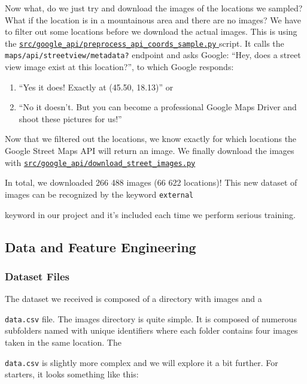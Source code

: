 \documentclass[]{article}
\providecommand{\tightlist}{%
  \setlength{\itemsep}{0pt}\setlength{\parskip}{0pt}}
\let\oldtexttt\texttt
\renewcommand{\texttt}[1]{
  \textcolor{tcolor}{\colorbox{bgcolor}{\oldtexttt{#1}}}
}
\begin{document}
Now what, do we just try and download the images of the locations we
sampled? What if the location is in a mountainous area and there are no
images? We have to filter out some locations before we download the
actual images. This is using the
\href{src/google_api/preprocess_api_coords_sample}{\texttt{src/google\_api/preprocess\_api\_coords\_sample.py}}
script. It calls the \texttt{maps/api/streetview/metadata?} endpoint and
asks Google: ``Hey, does a street view image exist at this location?'',
to which Google responds:

\begin{enumerate}
\def\labelenumi{\arabic{enumi}.}
\tightlist
\item
  ``Yes it does! Exactly at (45.50, 18.13)'' or
\item
  ``No it doesn't. But you can become a professional Google Maps Driver
  and shoot these pictures for us!''
\end{enumerate}

Now that we filtered out the locations, we know exactly for which
locations the Google Street Maps API will return an image. We finally
download the images with
\href{src/google_api/download_street_images.py}{\texttt{src/google\_api/download\_street\_images.py}}

In total, we downloaded 266 488 images (66 622 locations)! This new
dataset of images can be recognized by the keyword \texttt{external}
keyword in our project and it's included each time we perform serious
training.

\hypertarget{data-and-feature-engineering}{%
\subsection{Data and Feature
Engineering}\label{data-and-feature-engineering}}

\hypertarget{dataset-files}{%
\subsubsection{Dataset Files}\label{dataset-files}}

The dataset we received is composed of a directory with images and a
\texttt{data.csv} file. The images directory is quite simple. It is
composed of numerous subfolders named with unique identifiers where each
folder contains four images taken in the same location. The
\texttt{data.csv} is slightly more complex and we will explore it a bit
further. For starters, it looks something like this:
\end{document}
